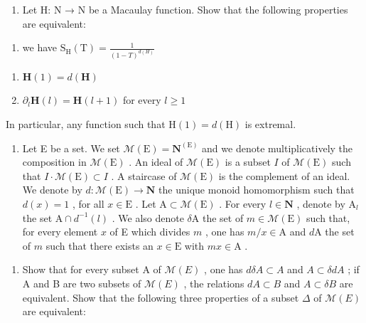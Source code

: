 \begin{enumerate}
\def\labelenumi{\alph{enumi})}
\setcounter{enumi}{4}
\tightlist
\item
  Let H: N → N be a Macaulay function. Show that the following properties are equivalent:
\end{enumerate}

\begin{enumerate}
\def\labelenumi{(\roman{enumi})}
\tightlist
\item
  we have \(\mathrm{S_H(T)} = \frac{1}{(1 - T)^{d(H)}}\)
\end{enumerate}

\begin{enumerate}
\def\labelenumi{(\roman{enumi})}
\setcounter{enumi}{1}
\item
  \(\mathbf{H}(1) = d(\mathbf{H})\)
\item
  \(\partial_{l}\mathbf{H}(l) = \mathbf{H}(l + 1)\) for every \(l\geqslant 1\)
\end{enumerate}

In particular, any function such that \(\mathrm{H}(1)=d(\mathrm{H})\) is extremal.

\begin{enumerate}
\def\labelenumi{\arabic{enumi})}
\setcounter{enumi}{7}
\tightlist
\item
  Let E be a set. We set \(\mathcal{M}(\mathrm{E}) = \mathbf{N}^{(\mathrm{E})}\) and we denote multiplicatively the composition in \(\mathcal{M}(\mathrm{E})\) . An ideal of \(\mathcal{M}(\mathrm{E})\) is a subset \(I\) of \(\mathcal{M}(\mathrm{E})\) such that \(I\cdot\mathcal{M}(\mathrm{E}) \subset I\) . A staircase of \(\mathcal{M}(\mathrm{E})\) is the complement of an ideal. We denote by \(d: \mathcal{M}(\mathrm{E}) \to \mathbf{N}\) the unique monoid homomorphism such that \(d(x) = 1\) , for all \(x \in \mathrm{E}\) . Let \(\mathrm{A} \subset \mathcal{M}(\mathrm{E})\) . For every \(l \in \mathbf{N}\) , denote by \(\mathrm{A}_l\) the set \(\mathrm{A} \cap d^{-1}(l)\) . We also denote \(\delta \mathrm{A}\) the set of \(m \in \mathcal{M}(\mathrm{E})\) such that, for every element \(x\) of E which divides \(m\) , one has \(m / x \in \mathrm{A}\) and \(d\mathrm{A}\) the set of \(m\) such that there exists an \(x \in \mathrm{E}\) with \(mx \in \mathrm{A}\) .
\end{enumerate}

\begin{enumerate}
\def\labelenumi{\alph{enumi})}
\tightlist
\item
  Show that for every subset A of \(\mathcal{M}(E)\) , one has \(d\delta A \subset A\) and \(A \subset \delta dA\) ; if A and B are two subsets of \(\mathcal{M}(E)\) , the relations \(dA \subset B\) and \(A \subset \delta B\) are equivalent. Show that the following three properties of a subset \(\Delta\) of \(\mathcal{M}(E)\) are equivalent:
\end{enumerate}

